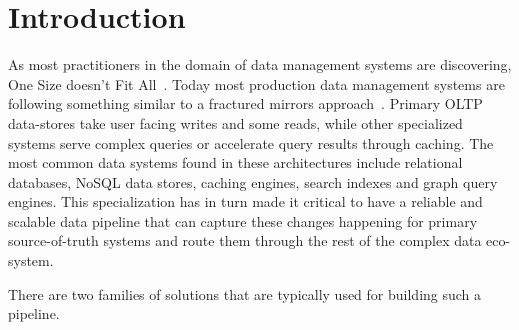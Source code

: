 \section{Introduction}

As most practitioners in the domain of data management systems are discovering, One Size doesn't Fit All~\cite{Stonebraker-2007}. Today most production data management systems are following something similar to a fractured mirrors approach~\cite{Ramamurthy-2002}.  Primary OLTP data-stores take user facing writes and some reads, while other specialized systems serve complex queries or accelerate query results through caching.  
The most common data systems found in these architectures include relational databases, NoSQL data stores, caching engines, search indexes and graph query engines. This specialization has in turn made it critical to have a reliable and scalable data pipeline that can capture these changes happening for primary source-of-truth systems and route them through the rest of the complex data eco-system. 


There are two families of solutions that are typically used for building such a pipeline.


